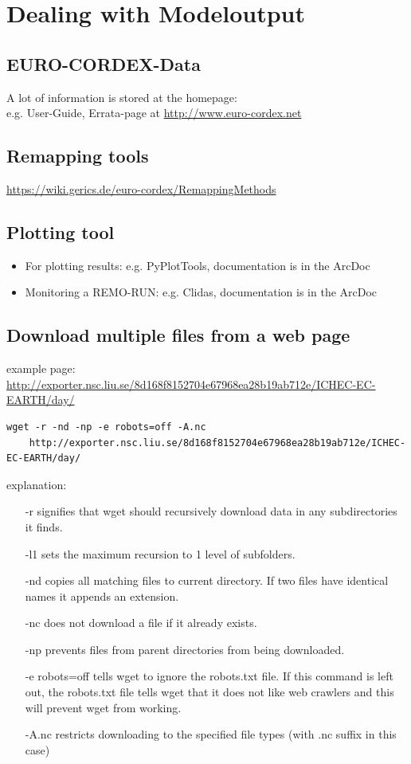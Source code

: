 \section{Dealing with Modeloutput}

\subsection{EURO-CORDEX-Data}
A lot of information is stored at the homepage:\\
e.g. User-Guide, Errata-page at \url{http://www.euro-cordex.net}

\subsection{Remapping tools}
\url{https://wiki.gerics.de/euro-cordex/RemappingMethods}

\subsection{Plotting tool}
\begin{itemize}
 \item For plotting results: e.g. PyPlotTools, documentation is in the ArcDoc
 
 \item Monitoring a REMO-RUN: e.g. Clidas, documentation is in the ArcDoc
\end{itemize}
\subsection{Download multiple files from a web page}

example page: \url{http://exporter.nsc.liu.se/8d168f8152704e67968ea28b19ab712e/ICHEC-EC-EARTH/day/}
{\small 
\begin{verbatim}
wget -r -nd -np -e robots=off -A.nc 
    http://exporter.nsc.liu.se/8d168f8152704e67968ea28b19ab712e/ICHEC-EC-EARTH/day/
\end{verbatim}}

explanation:
\begin{itemize}
\item[-r] signifies that wget should recursively download data in any subdirectories it finds.
\item[-l1] sets the maximum recursion to 1 level of subfolders.
\item[-nd] copies all matching files to current directory. If two files have identical names it appends an extension.
\item[-nc] does not download a file if it already exists.
\item[-np] prevents files from parent directories from being downloaded.
\item[-e robots=off] tells wget to ignore the robots.txt file. If this command is left out, the robots.txt file tells wget that it does not like web crawlers and this will prevent wget from working.
\item[-A.nc] restricts downloading to the specified file types (with .nc suffix in this case)
\end{itemize}

